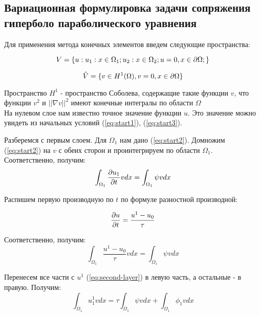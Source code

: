 \subsection{Вариационная формулировка задачи сопряжения гиперболо параболического уравнения}

Для применения метода конечных элементов введем следующие пространства:

\begin{equation}
     V = \{u: u_1: x \in \Omega_1; u_2: x \in \Omega_2; u=0, x \in {\partial \Omega};\} 
     \label{eq:v-space}
\end{equation}

\begin{equation}
     \hat{V} = \{v \in H^1(\Omega), v=0, x \in {\partial \Omega} \} 
     \label{eq:v-hat-space}
\end{equation}


Пространство $H^1$ - пространство Соболева, содержащие такие функции $v$,
что функции $v^2$  и $||\nabla v||^2$ имеют конечные интегралы по области $\Omega$ \\

На нулевом слое нам известно точное значение функции $u$. Это значение можно увидеть из начальных условий (\ref{eq:start1}), (\ref{eq:start3}).

Разберемся с первым слоем. Для $\Omega_1$ нам дано (\ref{eq:start2}). Домножим (\ref{eq:start2}) на $v$ с обеих сторон и проинтегрируем по области $\Omega_1$. Соответственно, получим:
$$
    \int_{\Omega_1}{\frac{\partial u_1}{\partial t}}vdx = \int_{\Omega_1}^{}\psi vdx
$$

Распишем первую производную по $t$ по формуле разностной производной:

\begin{equation}
    {\frac{\partial u}{\partial t}} = \frac{u^1 - u_0}{\tau}
    \label{eq:pdt-discr}
\end{equation}

Соответственно, получим:
\begin{equation}
    \int_{\Omega_1}^{}\frac{u^1 - u_0}{\tau}vdx = \int_{\Omega_1}^{}\psi vdx
    \label{eq:second-layer}
\end{equation}

Перенесем все части с $u^1$ (\ref{eq:second-layer}) в левую часть, а остальные - в правую. Получим:
\begin{equation}
    \int_{\Omega_1}^{}u_1^1 vdx= \tau\int_{\Omega_1}^{}\psi vdx + \int_{\Omega_1}^{}\phi_1 vdx
    \label{eq:second-layer-mke-form}
\end{equation}


